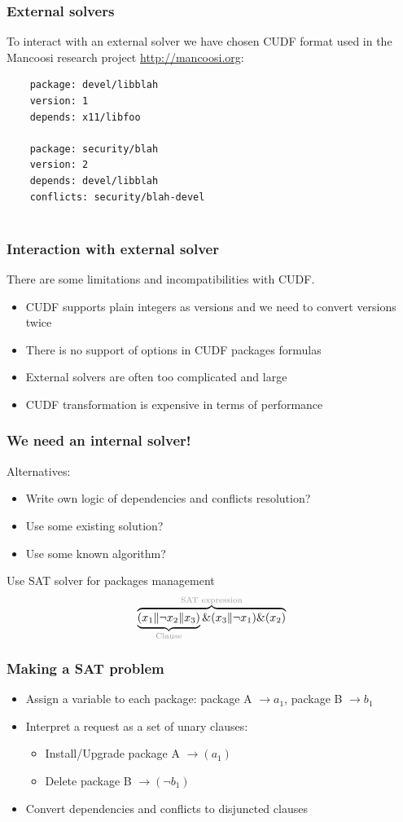\documentclass{beamer}
\begin{document}
\begin{frame}[fragile]
\frametitle{External solvers}
To interact with an external solver we have chosen CUDF format used in the
Mancoosi research project \url{http://mancoosi.org}:
\bigskip
{\small
	\begin{verbatim}
	package: devel/libblah
	version: 1
	depends: x11/libfoo

	package: security/blah
	version: 2
	depends: devel/libblah
	conflicts: security/blah-devel
	
	\end{verbatim}
}
\end{frame}

\begin{frame}
\frametitle{Interaction with external solver}
There are some limitations and incompatibilities with CUDF.
\begin{itemize}
  \item CUDF supports plain integers as versions and we need to convert
  versions twice
  \item There is no support of options in CUDF packages formulas
  \item External solvers are often too complicated and large
  \item CUDF transformation is expensive in terms of performance
\end{itemize}
\end{frame}

\begin{frame}
\frametitle{We need an internal solver!}

Alternatives:
\begin{itemize}
  \item Write own logic of dependencies and conflicts resolution?
  \pause
  \item Use some existing solution?
  \pause
  \item Use some known algorithm?
  \pause
\end{itemize}
\bigskip
{\large Use SAT solver for packages management}
\bigskip
\[
\overbrace{\underbrace{(x_1 \| \neg x_2 \|
x_3)}_{\text{\color{light-gray}Clause}} \& (x_3 \| \neg x_1) \&
(x_2)}^{\text{\color{light-gray}SAT expression}}
\]
\end{frame}

\begin{frame}
\frametitle{Making a SAT problem}
\begin{itemize}
  \item Assign a variable to each package: 
  package A $\to a_1$, package B $\to b_1$
  \item Interpret a request as a set of unary clauses:
  \begin{itemize}
    \item Install/Upgrade package A $\to (a_1)$
    \item Delete package B $\to (\neg b_1)$
  \end{itemize}
  \item Convert dependencies and conflicts to disjuncted clauses
\end{itemize}

\end{frame}
\end{document}
